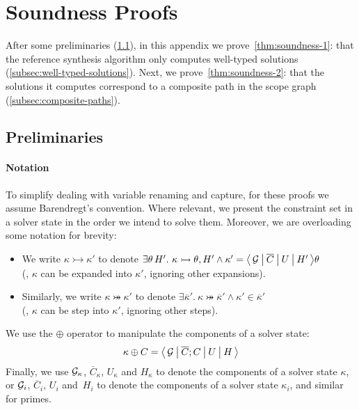 \section{Soundness Proofs}
After some preliminaries (\cref{subsec:preliminaries}), in this appendix we prove~\cref{thm:soundness-1}: that the reference synthesis algorithm only computes well-typed solutions (\cref{subsec:well-typed-solutions}).
Next, we prove~\cref{thm:soundness-2}: that the solutions it computes correspond to a composite path in the scope graph (\cref{subsec:composite-paths}).


\subsection{Preliminaries}%
\label{subsec:preliminaries}


\paragraph{Notation}
To simplify dealing with variable renaming and capture, for these proofs we assume Barendregt's convention.
Where relevant, we present the constraint set in a solver state in the order we intend to solve them.
Moreover, we are overloading some notation for brevity:
\begin{itemize}
  \item We write $\kappa \rightarrowtail \kappa'$ to denote $\exists \theta\, H'.\ \kappa \rightarrowtail \theta, H' \land \kappa' = \big\langle\, \mathcal{G}\: \big|\: \overline{C}\: \big|\: U\: \big|\: H'\, \big\rangle\theta$\\(\ie, $\kappa$ can be expanded into $\kappa'$, ignoring other expansions).
  \item Similarly, we write $\kappa \twoheadrightarrowtail \kappa'$ to denote $\exists \overline{\kappa}'.\ \kappa \twoheadrightarrowtail \overline{\kappa}' \land \kappa' \in \overline{\kappa}'$\\(\ie, $\kappa$ can be step into $\kappa'$, ignoring other steps).
\end{itemize}
We use the $\oplus$ operator to manipulate the components of a solver state:
\[
  \kappa \oplus C = \big\langle\, \mathcal{G}\: \big|\: \overline{C}; C\: \big|\: U\: \big|\: H\, \big\rangle
\]
Finally, we use $\mathcal{G}_\kappa$, $\overline{C}_\kappa$, $U_\kappa$ and $H_\kappa$ to denote the components of a solver state $\kappa$,
or $\mathcal{G}_i$, $\overline{C}_i$, $U_i$ and~$H_i$ to denote the components of a solver state $\kappa_i$, and similar for primes.


